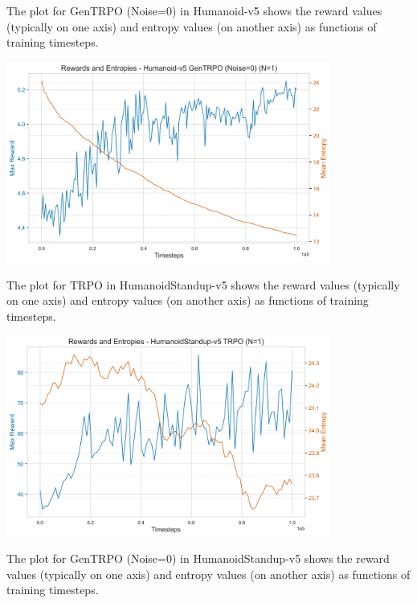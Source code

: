 \documentclass{svproc}
\begin{document}
The plot for GenTRPO (Noise=0) in Humanoid-v5 shows the reward values (typically on one axis) and entropy values (on another axis) as functions of training timesteps.

\begin{center}
\includegraphics[width=0.8\textwidth]{graph_Humanoid-v5_gentrpo_rewards_entropies.png}
\end{center}

The plot for TRPO in HumanoidStandup-v5 shows the reward values (typically on one axis) and entropy values (on another axis) as functions of training timesteps.

\begin{center}
\includegraphics[width=0.8\textwidth]{graph_HumanoidStandup-v5_trpo_rewards_entropies.png}
\end{center}

The plot for GenTRPO (Noise=0) in HumanoidStandup-v5 shows the reward values (typically on one axis) and entropy values (on another axis) as functions of training timesteps.
\end{document}

